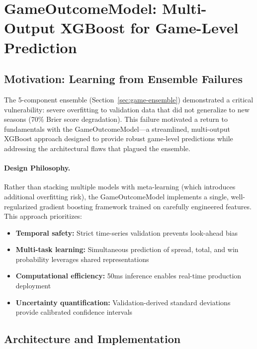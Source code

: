 \section{GameOutcomeModel: Multi-Output XGBoost for Game-Level Prediction}
\label{sec:game-outcome-model}

\subsection{Motivation: Learning from Ensemble Failures}

The 5-component ensemble (Section~\ref{sec:game-ensemble}) demonstrated a critical vulnerability: severe overfitting to validation data that did not generalize to new seasons (70\% Brier score degradation). This failure motivated a return to fundamentals with the GameOutcomeModel---a streamlined, multi-output XGBoost approach designed to provide robust game-level predictions while addressing the architectural flaws that plagued the ensemble.

\paragraph{Design Philosophy.}
Rather than stacking multiple models with meta-learning (which introduces additional overfitting risk), the GameOutcomeModel implements a single, well-regularized gradient boosting framework trained on carefully engineered features. This approach prioritizes:

\begin{itemize}[itemsep=2pt,parsep=0pt]
    \item \textbf{Temporal safety:} Strict time-series validation prevents look-ahead bias
    \item \textbf{Multi-task learning:} Simultaneous prediction of spread, total, and win probability leverages shared representations
    \item \textbf{Computational efficiency:} 50ms inference enables real-time production deployment
    \item \textbf{Uncertainty quantification:} Validation-derived standard deviations provide calibrated confidence intervals
\end{itemize}

\subsection{Architecture and Implementation}

